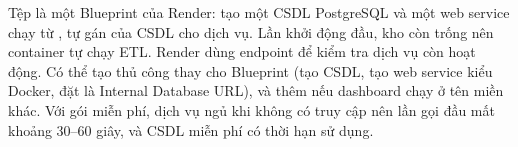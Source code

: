 Tệp  là một Blueprint của Render: tạo một CSDL PostgreSQL  và một web service chạy từ , tự gán  của CSDL cho dịch vụ. Lần khởi động đầu, kho còn trống nên container tự chạy ETL. Render dùng endpoint  để kiểm tra dịch vụ còn hoạt động. Có thể tạo thủ công thay cho Blueprint (tạo CSDL, tạo web service kiểu Docker, đặt  là Internal Database URL), và thêm  nếu dashboard chạy ở tên miền khác. Với gói miễn phí, dịch vụ ngủ khi không có truy cập nên lần gọi đầu mất khoảng 30--60 giây, và CSDL miễn phí có thời hạn sử dụng.

